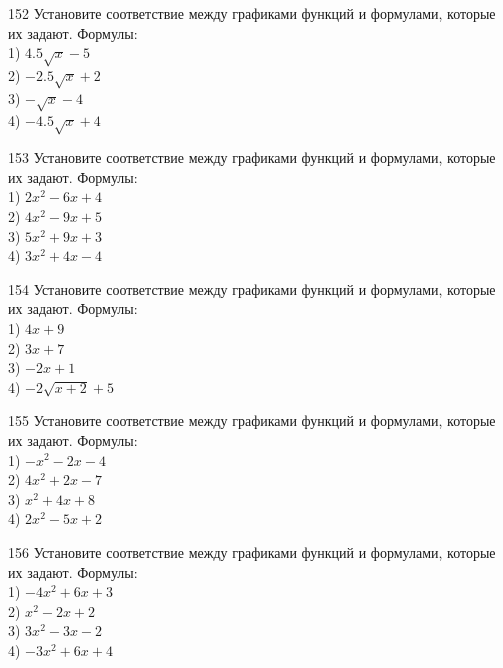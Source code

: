 \documentclass[4apaper]{article}
\begin{document}
\begin{taskBN}{152}
Установите соответствие между графиками функций и формулами, которые их задают. Формулы: \\1) $4.5\sqrt{x}-5$\\2) $-2.5\sqrt{x}+2$\\3) $-\sqrt{x}-4$\\4) $-4.5\sqrt{x}+4$
\end{taskBN}

\begin{taskBN}{153}
Установите соответствие между графиками функций и формулами, которые их задают. Формулы: \\1) $2x^2-6x+4$\\2) $4x^2-9x+5$\\3) $5x^2+9x+3$\\4) $3x^2+4x-4$
\end{taskBN}

\begin{taskBN}{154}
Установите соответствие между графиками функций и формулами, которые их задают. Формулы: \\1) $4x+9$\\2) $3x+7$\\3) $-2x+1$\\4) $-2\sqrt{x+2}+5$
\end{taskBN}

\begin{taskBN}{155}
Установите соответствие между графиками функций и формулами, которые их задают. Формулы: \\1) $-x^2-2x-4$\\2) $4x^2+2x-7$\\3) $x^2+4x+8$\\4) $2x^2-5x+2$
\end{taskBN}

\begin{taskBN}{156}
Установите соответствие между графиками функций и формулами, которые их задают. Формулы: \\1) $-4x^2+6x+3$\\2) $x^2-2x+2$\\3) $3x^2-3x-2$\\4) $-3x^2+6x+4$
\end{taskBN}
\end{document}
